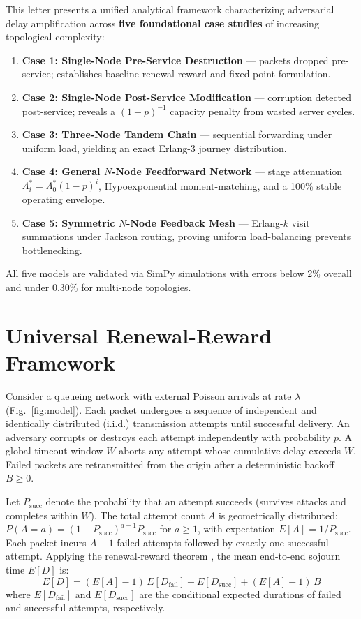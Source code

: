 \documentclass[journal,compsoc]{IEEEtran}
\begin{document}
This letter presents a unified analytical framework characterizing adversarial delay amplification across \textbf{five foundational case studies} of increasing topological complexity:
\begin{enumerate}
    \setlength{\itemsep}{0.5pt}
    \setlength{\parskip}{0pt}
    \item \textbf{Case 1: Single-Node Pre-Service Destruction} --- packets dropped pre-service; establishes baseline renewal-reward and fixed-point formulation.
    \item \textbf{Case 2: Single-Node Post-Service Modification} --- corruption detected post-service; reveals a $(1-p)^{-1}$ capacity penalty from wasted server cycles.
    \item \textbf{Case 3: Three-Node Tandem Chain} --- sequential forwarding under uniform load, yielding an exact Erlang-3 journey distribution.
    \item \textbf{Case 4: General $N$-Node Feedforward Network} --- stage attenuation $\Lambda_i^* = \Lambda_0^*(1-p)^i$, Hypoexponential moment-matching, and a 100\% stable operating envelope.
    \item \textbf{Case 5: Symmetric $N$-Node Feedback Mesh} --- Erlang-$k$ visit summations under Jackson routing, proving uniform load-balancing prevents bottlenecking.
\end{enumerate}
All five models are validated via SimPy simulations \cite{matloff2008introduction} with errors below 2\% overall and under 0.30\% for multi-node topologies.

\section{Universal Renewal-Reward Framework}
Consider a queueing network with external Poisson arrivals at rate $\lambda$ (Fig.~\ref{fig:model}). Each packet undergoes a sequence of independent and identically distributed (i.i.d.) transmission attempts until successful delivery. An adversary corrupts or destroys each attempt independently with probability $p$. A global timeout window $W$ aborts any attempt whose cumulative delay exceeds $W$. Failed packets are retransmitted from the origin after a deterministic backoff $B \ge 0$.

Let $P_{\text{succ}}$ denote the probability that an attempt succeeds (survives attacks and completes within $W$). The total attempt count $A$ is geometrically distributed: $P(A = a) = (1 - P_{\text{succ}})^{a-1} P_{\text{succ}}$ for $a \ge 1$, with expectation $E[A] = 1/P_{\text{succ}}$. Each packet incurs $A - 1$ failed attempts followed by exactly one successful attempt. Applying the renewal-reward theorem \cite{ross1996stochastic}, the mean end-to-end sojourn time $E[D]$ is:
\begin{equation}
E[D] = (E[A] - 1)\, E[D_{\text{fail}}] + E[D_{\text{succ}}] + (E[A] - 1)\, B
\label{eq:renewal}
\end{equation}
where $E[D_{\text{fail}}]$ and $E[D_{\text{succ}}]$ are the conditional expected durations of failed and successful attempts, respectively.
\end{document}
